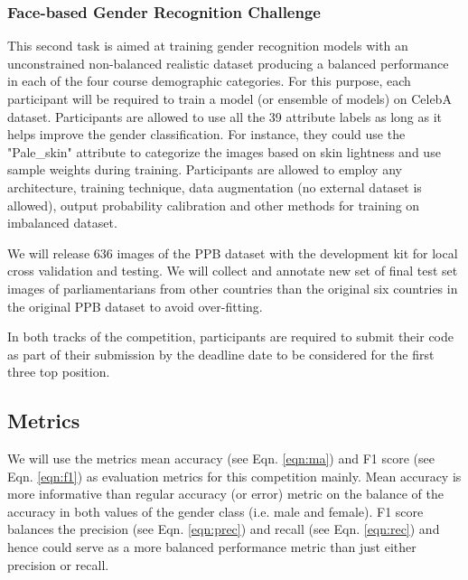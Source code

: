 \documentclass[11pt, oneside]{article}
\begin{document}
\subsubsection{Face-based Gender Recognition Challenge}
This second task is aimed at training gender recognition models with an unconstrained non-balanced realistic dataset producing a balanced performance in each of the four course demographic categories. For this purpose, each participant will be required to train a model (or ensemble of models) on CelebA dataset. Participants are allowed to use all the 39 attribute labels as long as it helps improve the gender classification. For instance, they could use the "Pale\_skin" attribute to categorize the images based on skin lightness and use sample weights during training. Participants are allowed to employ any architecture, training technique, data augmentation (no external dataset is allowed), output probability calibration and other methods for training on imbalanced dataset.

We will release 636 images of the PPB dataset with the development kit for local cross validation and testing. We will collect and annotate new set of final test set images of parliamentarians from other countries than the original six countries in the original PPB dataset to avoid over-fitting. 

In both tracks of the competition, participants are required to submit their code as part of their submission by the deadline date to be considered for the first three top position.


\subsection{Metrics}
\label{sec:metrics}
We will use the metrics mean accuracy (see Eqn. \ref{eqn:ma}) and F1 score (see Eqn. \ref{eqn:f1}) as evaluation metrics for this competition mainly. Mean accuracy is more informative than regular accuracy (or error) metric on the balance of the accuracy in both values of the gender class (i.e. male and female). F1 score balances the precision (see Eqn. \ref{eqn:prec}) and recall (see Eqn. \ref{eqn:rec}) and hence could serve as a more balanced performance metric than just either precision or recall.
\end{document}
